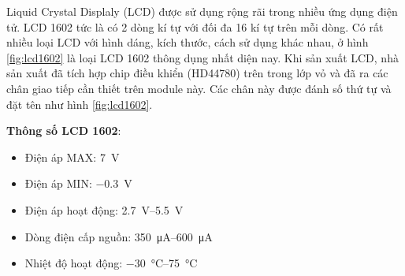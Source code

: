 Liquid Crystal Displaly (LCD) được sử dụng rộng rãi trong nhiều ứng dụng điện tử.
LCD 1602 tức là có 2 dòng kí tự với đối đa 16 kí tự trên mỗi dòng.
Có rất nhiều loại LCD với hình dáng, kích thước, cách sử dụng khác nhau, ở hình \ref{fig:lcd1602} là loại LCD 1602 thông dụng nhất diện nay.
Khi sản xuất LCD, nhà sản xuất đã tích hợp chip điều khiển (HD44780) trên trong lớp vỏ và đã ra các chân giao tiếp cần thiết trên module này.
Các chân này được đánh số thứ tự và đặt tên như hình \ref{fig:lcd1602}.

\newpage
\textbf{Thông số LCD 1602}:
\begin{itemize}
\item Điện áp MAX: \si{7\volt}
\item Điện áp MIN: \si{\num{-0.3}\volt}
\item Điện áp hoạt động: \SIrange[range-phrase=--, range-units=single]{2.7}{5.5}{\volt}
\item Dòng điện cấp nguồn: \SIrange[range-phrase=--, range-units=single]{350}{600}{\micro\ampere}
\item Nhiệt độ hoạt động: \SIrange[range-phrase=--, range-units=single]{-30}{75}{\celsius}
\end{itemize}

